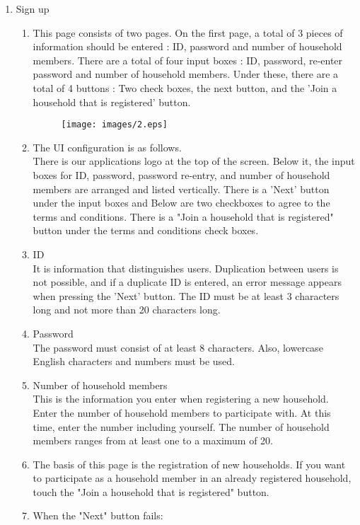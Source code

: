 \documentclass[11pt, conference]{IEEEtran}
\begin{document}
\begin{enumerate}[label=\arabic*]
    \item {\large{Sign up}}
    \begin{enumerate}[label=\alph*]
        \item This page consists of two pages. On the first page, a total of 3 pieces of information should be entered : ID, password and number of household members. There are a total of four input boxes : ID, password, re-enter password and number of household members. Under these, there are a total of 4 buttons : Two check boxes, the next button, and the 'Join a household that is registered' button.
        \begin{figure}[H]
            \centering
            \texttt{[image: images/2.eps]}
        \end{figure}
        \item The UI configuration is as follows.\\
        There is  our applications logo at the top of the screen. Below it, the input boxes for ID, password, password re-entry, and number of household members are arranged and listed vertically. There is a 'Next' button under the input boxes and Below are two checkboxes to agree to the terms and conditions. There is a "Join a household that is registered" button under the terms and conditions check boxes.
        \item ID\\
        It is information that distinguishes users. Duplication between users is not possible, and if a duplicate ID is entered, an error message appears when pressing the 'Next' button. The ID must be at least 3 characters long and not more than 20 characters long.
        \item Password\\
        The password must consist of at least 8 characters. Also, lowercase English characters and numbers must be used.
        \item Number of household members\\
        This is the information you enter when registering a new household. Enter the number of household members to participate with. At this time, enter the number including yourself. The number of household members ranges from at least one to a maximum of 20.
        \item The basis of this page is the registration of new households. If you want to participate as a household member in an already registered household, touch the "Join a household that is registered" button.
        \item When the "Next" button fails:

\end{enumerate}
\end{enumerate}
\end{document}
